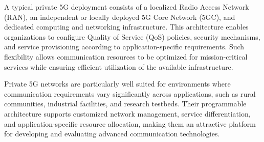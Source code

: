 \documentclass[12pt,a4paper]{report}
\begin{document}
	A typical private 5G deployment consists of a localized Radio Access Network (RAN), an independent or locally deployed 5G Core Network (5GC), and dedicated computing and networking infrastructure. This architecture enables organizations to configure Quality of Service (QoS) policies, security mechanisms, and service provisioning according to application-specific requirements. Such flexibility allows communication resources to be optimized for mission-critical services while ensuring efficient utilization of the available infrastructure.
	
	Private 5G networks are particularly well suited for environments where communication requirements vary significantly across applications, such as rural communities, industrial facilities, and research testbeds. Their programmable architecture supports customized network management, service differentiation, and application-specific resource allocation, making them an attractive platform for developing and evaluating advanced communication technologies.
	
	
	
\end{document}
